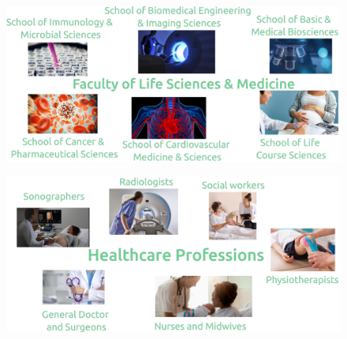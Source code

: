 
{
\begin{frame}{}

  \begin{figure}
  \centering
  \includegraphics[width=1.0\textwidth]{./../figures/schools-at-life-science-and-medicine/versions/drawing-v00}
  \end{figure}

\end{frame}
}



{
\begin{frame}{}

  \begin{figure}
  \centering
  \includegraphics[width=1.0\textwidth]{./../figures/healthcare-professionals/versions/drawing-v02}
  \end{figure}

\end{frame}
}


%
%


